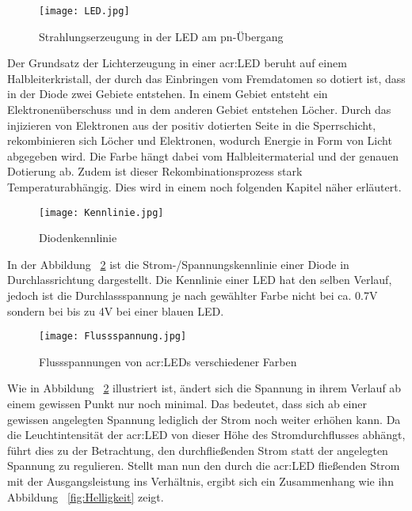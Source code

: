 \begin{figure}[h]
	\centering
	\texttt{[image: LED.jpg]}
	\caption[Strahlungserzeugung in der LED am pn-Übergang]{Strahlungserzeugung in der LED am pn-Übergang} \cite{slabke}
	\label{fig:LED}
\end{figure}

Der Grundsatz der Lichterzeugung in einer \gls{acr:LED} beruht auf einem Halbleiterkristall, der durch das Einbringen vom Fremdatomen so dotiert ist, dass in der Diode zwei Gebiete entstehen. In einem Gebiet entsteht ein Elektronenüberschuss und in dem anderen Gebiet entstehen Löcher. Durch das injizieren von Elektronen aus der positiv dotierten Seite in die Sperrschicht, rekombinieren sich Löcher und Elektronen, wodurch Energie in Form von Licht abgegeben wird.\cite{slabke} Die Farbe hängt dabei vom Halbleitermaterial und der genauen Dotierung ab. Zudem ist dieser Rekombinationsprozess stark Temperaturabhängig. Dies wird in einem noch folgenden Kapitel näher erläutert.

\begin{figure}[h]
	\centering
	\texttt{[image: Kennlinie.jpg]}
	\caption[Diodenkennlinie]{Diodenkennlinie} 
	\cite{Vorlesung_Elektonik}
	\label{fig:Kennlinie}
\end{figure}


In der Abbildung ~\ref{fig:Kennlinie} ist die Strom-/Spannungskennlinie einer Diode in Durchlassrichtung
dargestellt. Die Kennlinie einer LED hat den selben Verlauf, jedoch ist die Durchlassspannung
je nach gewählter Farbe nicht bei ca. 0.7V sondern bei bis zu 4V bei
einer blauen LED. 

\begin{figure}[h]
	\centering
	\texttt{[image: Flussspannung.jpg]}
	\caption[Flussspannungen von \gls{acr:LED}s verschiedener Farben]{Flussspannungen von \gls{acr:LED}s verschiedener Farben} 
	\cite{Vorlesung_Elektonik}
	\label{fig:Flussspannung}
\end{figure}

Wie in Abbildung ~\ref{fig:Kennlinie} illustriert ist, ändert sich die Spannung in ihrem Verlauf
ab einem gewissen Punkt nur noch minimal. Das bedeutet, dass sich ab einer gewissen
angelegten Spannung lediglich der Strom noch weiter erhöhen kann. Da die
Leuchtintensität der \gls{acr:LED} von dieser Höhe des Stromdurchflusses abhängt, führt dies zu der
Betrachtung, den durchfließenden Strom statt der angelegten Spannung zu regulieren.
Stellt man nun den durch die \gls{acr:LED} fließenden Strom mit der Ausgangsleistung
ins Verhältnis, ergibt sich ein Zusammenhang wie ihn Abbildung ~\ref{fig:Helligkeit} zeigt. 

